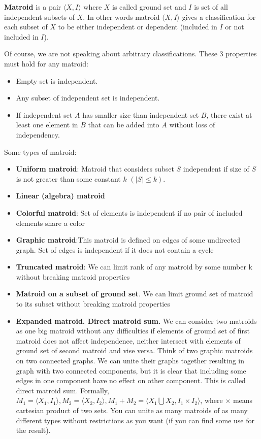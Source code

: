 \documentclass[11pt]{article}
\begin{document}
\begin{multicols}{3}
\textbf{Matroid} is a pair $⟨X,I⟩$ where $X$ is called ground set and $I$ is set of all independent subsets of $X$. In other words matroid $⟨X,I⟩$ gives a classification for each subset of $X$ to be either independent or dependent (included in $I$ or not included in $I$).

Of course, we are not speaking about arbitrary classifications. These 3 properties must hold for any matroid:

\begin{itemize}
    \item Empty set is independent.
    \item Any subset of independent set is independent.
    \item If independent set $A$ has smaller size than independent set $B$, there exist at least one element in $B$ that can be added into $A$ without loss of independency.
\end{itemize}

Some types of matroid:
\begin{itemize}
    \item \textbf{Uniform matroid}: Matroid that considers subset $S$ independent if size of $S$ is not greater than some constant $k$ $(|S| \leq k)$.
    \item \textbf{Linear (algebra) matroid}
    \item \textbf{Colorful matroid}: Set of elements is independent if no pair of included elements share a color
    \item \textbf{Graphic matroid}:This matroid is defined on edges of some undirected graph. Set of edges is independent if it does not contain a cycle
    \item \textbf{Truncated matroid}: We can limit rank of any matroid by some number k without breaking matroid properties
    \item \textbf{Matroid on a subset of ground set}. We can limit ground set of matroid to its subset without breaking matroid properties
    \item \textbf{Expanded matroid. Direct matroid sum. }We can consider two matroids as one big matroid without any difficulties if elements of ground set of first matroid does not affect independence, neither intersect with elements of ground set of second matroid and vise versa. Think of two graphic matroids on two connected graphs. We can unite their graphs together resulting in graph with two connected components, but it is clear that including some edges in one component have no effect on other component. This is called direct matroid sum. Formally, $M_1=⟨X_1,I_1⟩, M_2=⟨X_2,I_2⟩, M_1+M_2=⟨X_1 \bigcup X_2,I_1\times I_2⟩$, where $\times$ means cartesian product of two sets. You can unite as many matroids of as many different types without restrictions as you want (if you can find some use for the result).


\end{itemize}
\end{multicols}
\end{document}
